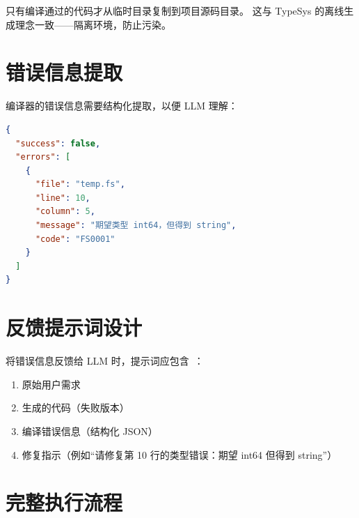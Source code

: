 \documentclass[10pt, openany]{book}
\begin{document}
只有编译通过的代码才从临时目录复制到项目源码目录。
这与 TypeSys 的离线生成理念一致——隔离环境，防止污染。

\section{错误信息提取}

编译器的错误信息需要结构化提取，以便 LLM 理解：

\begin{lstlisting}[language=JSON]
{
  "success": false,
  "errors": [
    {
      "file": "temp.fs",
      "line": 10,
      "column": 5,
      "message": "期望类型 int64，但得到 string",
      "code": "FS0001"
    }
  ]
}
\end{lstlisting}

\section{反馈提示词设计}

将错误信息反馈给 LLM 时，提示词应包含~\cite{Shinn2024Reflexion,Wang2023SelfRefine}：
\begin{enumerate}
    \item 原始用户需求
    \item 生成的代码（失败版本）
    \item 编译错误信息（结构化 JSON）
    \item 修复指示（例如``请修复第 10 行的类型错误：期望 int64 但得到 string''）
\end{enumerate}

\section{完整执行流程}
\end{document}
